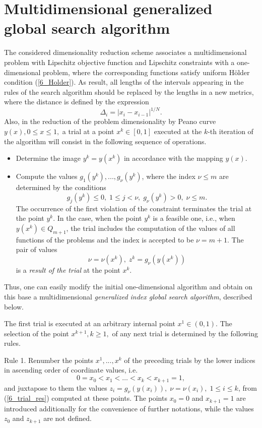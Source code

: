 \section{Multidimensional generalized global search algorithm}
The considered dimensionality reduction scheme associates a multidimensional problem with Lipschitz objective function and Lipschitz constraints with a one-dimensional problem, where the corresponding functions satisfy uniform H\"older condition (\ref{6_Holder}). As result, all lengths of the intervals appearing in the rules of the search algorithm should be replaced by the lengths in a new metrics, where the distance is defined by the expression
\[
\Delta_i = \left|x_i-x_{i-1}\right|^{1/N}.
\]
Also, in the reduction of the problem dimensionality by Peano curve  $y(x), 0 \leq x \leq 1,$ a trial at a point $x^k \in [0,1]$ executed at the $k$-th iteration of the algorithm will consist in the following sequence of operations.
\begin{itemize}
	\item Determine the image  $y^k=y(x^k)$ in accordance with the mapping  $y(x)$.
	\item Compute the values  $g_1(y^k),...,g_\nu(y^k)$, where the index $\nu \leq m$ are determined by the conditions
	\[
	g_j(y^k)\leq 0, \; 1 \leq j<\nu, \; g_\nu(y^k)>0, \; \nu \leq m.
	\]
	The occurrence of the first violation of the constraint terminates the trial at the point $y^k$. In the case, when the point $y^k$ is a feasible one, i.e., when $y(x^k) \in Q_{m+1}$, the trial includes the computation of the values of all functions of the problems and the index is accepted to be $\nu = m+1$. The pair of values
	\begin{equation}\label{6_trial_res}
	\nu = \nu(x^k), \; z^k = g_\nu(y(x^k))
	\end{equation}
	is a \textit{result of the trial} at the point $x^k$.
\end{itemize}

Thus, one can easily modify the initial one-dimensional algorithm and obtain on this base a multidimensional \textit{generalized index global search algorithm}, described below.

The first trial is executed at an arbitrary internal point $x^1 \in (0,1)$. The selection of the point $x^{k+1}, k \geq 1,$ of any next trial is determined by the following rules.

Rule 1. Renumber the points $x^1,...,x^k$ of the preceding trials by the
lower indices in ascending order of coordinate values, i.e.
\begin{equation}\label{6_trial_points}
0=x_0<x_1<\dots <x_k<x_{k+1}=1,
\end{equation}
and juxtapose to them the values $z_i=g_\nu(y(x_i)), \; \nu=\nu(x_i), \; 1 \leq i \leq k$, from (\ref{6_trial_res}) computed at these points. The points $x_0=0$ and
$x_{k+1}=1$ are introduced additionally for the convenience of further notations, while the values $z_0$ and
$z_{k+1}$ are not defined.

